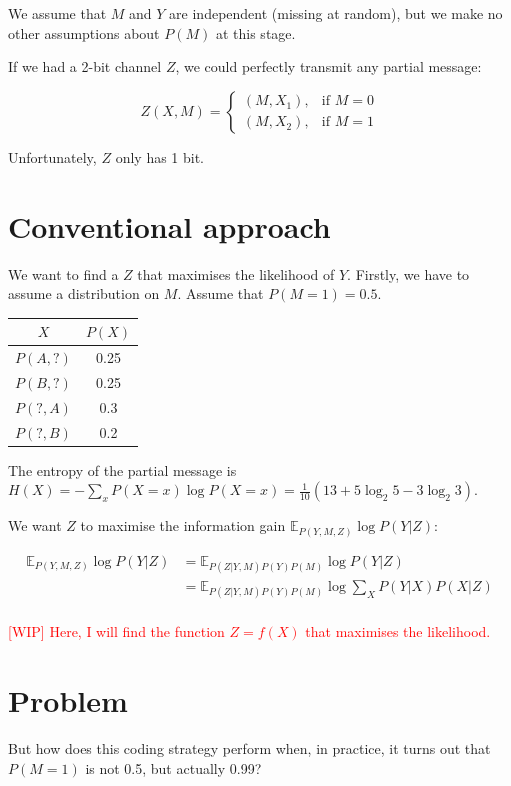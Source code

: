 \documentclass[a4paper,12pt]{article}
\newcommand{\crit}[1]{\textcolor{red}{#1}}
\begin{document}
We assume that $M$ and $Y$ are independent (missing at random), but we make no other assumptions about $P(M)$ at this stage.

If we had a 2-bit channel $Z$, we could perfectly transmit any partial message:

$$Z(X,M) = \left\{
\begin{array}{ll}
   (M, X_1), & \textrm{if } M=0 \\
   (M, X_2), & \textrm{if } M=1
\end{array} \right.$$

Unfortunately, $Z$ only has 1 bit.

\section{Conventional approach} 

We want to find a $Z$ that maximises the likelihood of $Y$. Firstly, we have to assume a distribution on $M$. Assume that $P(M=1) = 0.5$. 

\begin{tabular}{c c}
   $X$ & $P(X)$ \\ \hline
   $P(A,?)$ & 0.25 \\
   $P(B,?)$ & 0.25 \\
   $P(?,A)$ & 0.3 \\
   $P(?,B)$ & 0.2 
\end{tabular}

The entropy of the partial message is $H(X) = - \sum_{x} P(X=x) \log P(X=x) = \frac{1}{10} (13 + 5 \log_2 5 - 3 \log_2 3)$.

We want $Z$ to maximise the information gain $\mathbb{E}_{P(Y,M,Z)} \log P(Y | Z)$:

\begin{align*}
   \mathbb{E}_{P(Y,M,Z)} \log P(Y | Z) &= \mathbb{E}_{P(Z | Y,M) P(Y) P(M)} \log P(Y | Z) \\
   &= \mathbb{E}_{P(Z | Y,M) P(Y) P(M)} \log \sum_{X} P(Y | X) P(X | Z) \\
\end{align*}

\crit{[WIP] Here, I will find the function $Z = f(X)$ that maximises the likelihood.}

\section{Problem} 

But how does this coding strategy perform when, in practice, it turns out that $P(M=1)$ is not 0.5, but actually 0.99?
\end{document}
